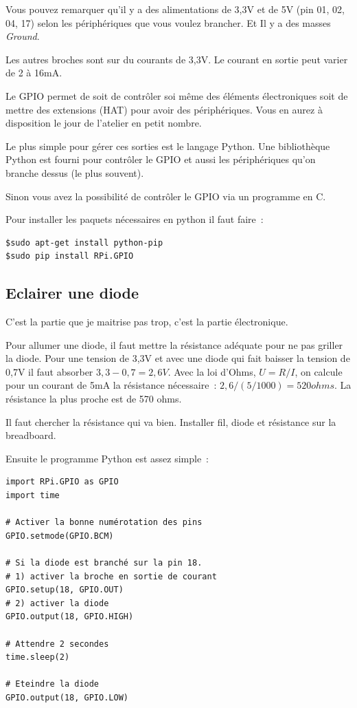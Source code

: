 Vous pouvez remarquer qu'il y a des alimentations de 3,3V et de 5V (pin 01, 02, 04, 17) selon les périphériques que vous voulez brancher. Et Il y a des masses \emph{Ground}.

Les autres broches sont sur du courants de 3,3V. Le courant en sortie peut varier de 2 à 16mA. 

Le GPIO permet de soit de contrôler soi même des éléments électroniques soit de mettre des extensions (HAT) pour avoir des périphériques. Vous en aurez à disposition le jour de l'atelier en petit nombre.

Le plus simple pour gérer ces sorties est le langage Python. Une bibliothèque Python est fourni pour contrôler le GPIO et aussi les périphériques qu'on branche dessus (le plus souvent).

Sinon vous avez la possibilité de contrôler le GPIO via un programme en C.

Pour installer les paquets nécessaires en python il faut faire~:
\begin{verbatim}
$sudo apt-get install python-pip
$sudo pip install RPi.GPIO
\end{verbatim}


\subsection{Eclairer une diode}

C'est la partie que je maitrise pas trop, c'est la partie électronique.

Pour allumer une diode, il faut mettre la résistance adéquate pour ne pas griller la diode. Pour une tension de 3,3V et avec une diode qui fait baisser la tension de 0,7V il faut absorber $3,3-0,7=2,6V$. Avec la loi d'Ohms, $U=R/I$, on calcule pour un courant de 5mA la résistance nécessaire~: $2,6/(5/1000)=520 ohms$. La résistance la plus proche est de 570 ohms. 

Il faut chercher la résistance qui va bien. Installer fil, diode et résistance sur la breadboard.

Ensuite le programme Python est assez simple~:
\begin{verbatim}
import RPi.GPIO as GPIO
import time

# Activer la bonne numérotation des pins
GPIO.setmode(GPIO.BCM)

# Si la diode est branché sur la pin 18.
# 1) activer la broche en sortie de courant
GPIO.setup(18, GPIO.OUT)
# 2) activer la diode
GPIO.output(18, GPIO.HIGH)

# Attendre 2 secondes
time.sleep(2)

# Eteindre la diode
GPIO.output(18, GPIO.LOW)
\end{verbatim} 

